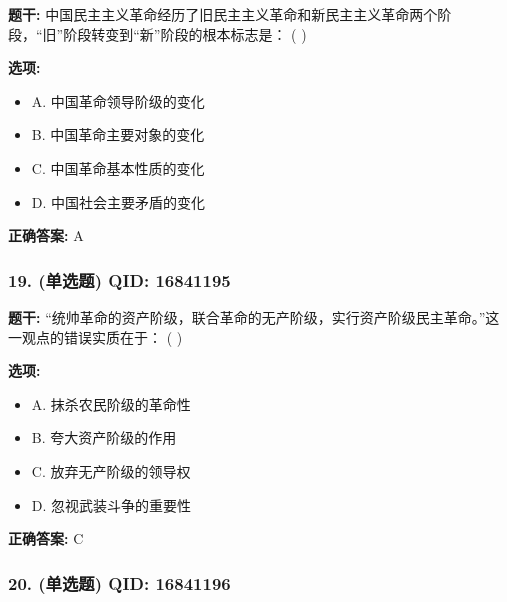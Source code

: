 \documentclass[12pt,UTF8]{ctexart}
\begin{document}
\textbf{题干:}
中国民主主义革命经历了旧民主主义革命和新民主主义革命两个阶段，“旧”阶段转变到“新”阶段的根本标志是： ( )

\textbf{选项:}
\begin{itemize}[leftmargin=*]

  \item A. 中国革命领导阶级的变化

  \item B. 中国革命主要对象的变化

  \item C. 中国革命基本性质的变化

  \item D. 中国社会主要矛盾的变化

\end{itemize}

\textbf{正确答案:}
A

\vspace{0.3em}\hrulefill\vspace{0.7em}

\subsubsection*{19. (单选题) \small QID: 16841195}

\textbf{题干:}
“统帅革命的资产阶级，联合革命的无产阶级，实行资产阶级民主革命。”这一观点的错误实质在于： ( )

\textbf{选项:}
\begin{itemize}[leftmargin=*]

  \item A. 抹杀农民阶级的革命性

  \item B. 夸大资产阶级的作用

  \item C. 放弃无产阶级的领导权

  \item D. 忽视武装斗争的重要性

\end{itemize}

\textbf{正确答案:}
C

\vspace{0.3em}\hrulefill\vspace{0.7em}

\subsubsection*{20. (单选题) \small QID: 16841196}
\end{document}
